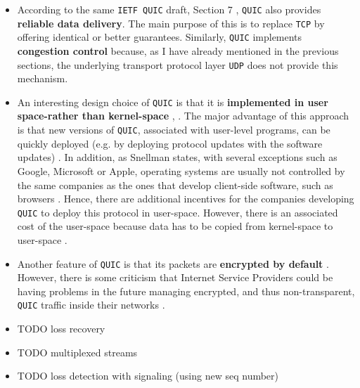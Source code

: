 \documentclass[12pt,a4paper,twoside,openright]{report}
\begin{document}
\begin{itemize}
  \item 
    According to the same \texttt{IETF QUIC} draft, Section 7 \cite{ietf-quic-transport-draft}, \texttt{QUIC} also provides \textbf{reliable data delivery}.
    The main purpose of this is to replace \texttt{TCP} by offering identical or better guarantees. 
    Similarly, \texttt{QUIC} implements \textbf{congestion control} because, as I have already mentioned in the previous sections, the underlying transport protocol layer \texttt{UDP} does not provide this mechanism. 
  
 


  \item 
  An interesting design choice of \texttt{QUIC} is that it is \textbf{implemented in user space-rather than kernel-space} \cite{the-road-to-quic}, \cite{Implementation_and_Performance_Evaluation_of_the_QUIC_Protocol_in_Linux_Kernel}.
  The major advantage of this approach is that new versions of \texttt{QUIC}, associated with user-level programs, can be quickly deployed (e.g. by deploying protocol updates with the software updates) \cite{the-road-to-quic}.
  In addition, as Snellman states, with several exceptions such as Google, Microsoft or Apple, operating systems are usually not controlled by the same companies as the ones that develop client-side software, such as browsers \cite{2016-12-01-quic-tou}.
  Hence, there are additional incentives for the companies developing \texttt{QUIC} to deploy this protocol in user-space.
  However, there is an associated cost of the user-space because data has to be copied from kernel-space to user-space \cite{benchmarking-quic}.
  
  
 
  \item Another feature of \texttt{QUIC} is that its packets are \textbf{encrypted by default} \cite{the-road-to-quic}.
  However, there is some criticism that Internet Service Providers could be having problems in the future managing encrypted, and thus non-transparent, \texttt{QUIC} traffic inside their networks \cite{why-is-googles-quic-leaving-network-operators-in-the-dark}.
  
  

  
  \item TODO loss recovery
  
  \item TODO multiplexed streams
 
  \item TODO loss detection with signaling (using new seq number)
  
  
\end{itemize}
\end{document}
